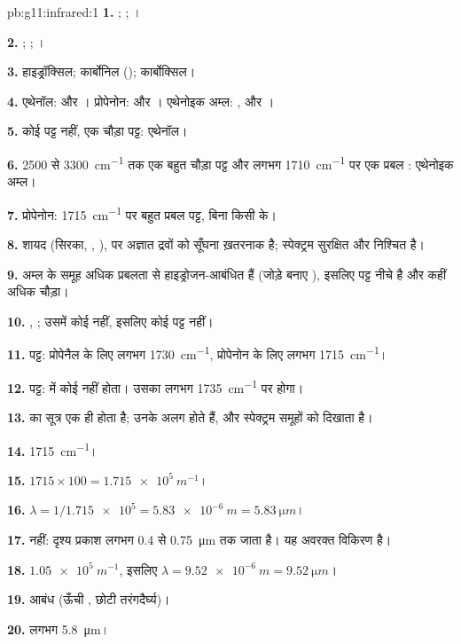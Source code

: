 \begin{solution}{pb:g11:infrared:1}
\textbf{1.} ; ; ।

\textbf{2.} ; ; ।

\textbf{3.} हाइड्रॉक्सिल; कार्बोनिल (); कार्बोक्सिल।

\textbf{4.} एथेनॉल:  और । प्रोपेनोन:  और
। एथेनोइक अम्ल: ,  और ।

\textbf{5.} कोई  पट्ट नहीं, एक चौड़ा  पट्ट: एथेनॉल।

\textbf{6.} 2500 से \qty{3300}{cm^{-1}} तक एक बहुत चौड़ा  पट्ट
और लगभग \qty{1710}{cm^{-1}} पर एक प्रबल : एथेनोइक अम्ल।

\textbf{7.} प्रोपेनोन: \qty{1715}{cm^{-1}} पर बहुत प्रबल  पट्ट,
बिना किसी  के।

\textbf{8.} शायद (सिरका, , ), पर अज्ञात द्रवों को सूँघना
ख़तरनाक है; स्पेक्ट्रम सुरक्षित और निश्चित है।

\textbf{9.} अम्ल के  समूह अधिक प्रबलता से हाइड्रोजन-आबंधित हैं
(जोड़े बनाए ), इसलिए पट्ट नीचे है और कहीं अधिक चौड़ा।

\textbf{10.} , ; उसमें कोई  नहीं, इसलिए कोई
 पट्ट नहीं।

\textbf{11.}  पट्ट: प्रोपेनैल के लिए लगभग \qty{1730}{cm^{-1}},
प्रोपेनोन के लिए लगभग \qty{1715}{cm^{-1}}।

\textbf{12.}  पट्ट:  में कोई  नहीं होता। उसका 
लगभग \qty{1735}{cm^{-1}} पर होगा।

\textbf{13.}  का सूत्र एक ही होता है; उनके  अलग होते हैं,
और स्पेक्ट्रम समूहों को दिखाता है।

\textbf{14.} \qty{1715}{cm^{-1}}।

\textbf{15.} $1715 \times 100 = \qty{1.715e5}{m^{-1}}$।

\textbf{16.} $\lambda = 1/\num{1.715e5} = \qty{5.83e-6}{m} =
\qty{5.83}{\micro m}$।

\textbf{17.} नहीं: दृश्य प्रकाश लगभग 0.4 से
\qty{0.75}{\micro m} तक जाता है। यह अवरक्त विकिरण है।

\textbf{18.} $\num{1.05e5}\ \si{m^{-1}}$, इसलिए $\lambda = \qty{9.52e-6}{m}
= \qty{9.52}{\micro m}$।

\textbf{19.}  आबंध (ऊँची , छोटी तरंगदैर्घ्य)।

\textbf{20.} लगभग \qty{5.8}{\micro m}।
\end{solution}
